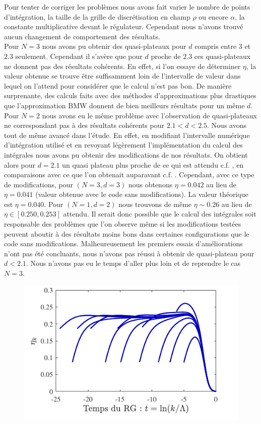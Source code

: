 \documentclass[10.5pt]{article}
\begin{document}
\begin{multicols*}{2}
 Pour tenter de corriger les problèmes nous avons fait varier le nombre de points d'intégration, la taille de la grille de discrétisation en champ $\rho$ ou encore $\alpha$, la constante multiplicative devant le régulateur. Cependant nous n'avons trouvé aucun changement de comportement des résultats.\\
\indent
Pour $N=3$ nous avons pu obtenir des quasi-plateaux pour $d$ compris entre $3$ et $2.3$ seulement. Cependant il s'avère que  pour $d$ proche de $2.3$ ces quasi-plateaux ne donnent pas des résultats cohérents. En effet, si l'on essaye de déterminer $\eta$, la valeur obtenue se trouve être suffisamment loin de l'intervalle de valeur dans lequel on l'attend pour considérer que le calcul n'est pas bon. De manière surprenante, des calculs faits avec des méthodes d'approximations plus drastiques que l'approximation BMW donnent de bien meilleurs résultats pour un même $d$.\\
\indent
Pour $N=2$ nous avons eu le même problème avec l'observation de quasi-plateaux ne correspondant pas à des résultats cohérents pour $2.1 < d < 2.5$. Nous avons tout de même avancé dans l'étude. En effet, en modifiant l'intervalle numérique d'intégration utilisé et en revoyant légèrement l'implémentation du calcul des intégrales nous avons pu obtenir des modifications de nos résultats. On obtient alors pour $d=2.1$ un quasi plateau plus proche de ce qui est attendu c.f. , en comparaisons avec ce que l'on obtenait auparavant c.f. . Cependant, avec ce type de modifications, pour $(N=3, d=3)$ nous obtenons $\eta= 0.042$ au lieu de $\eta = 0.041$ (valeur obtenue avec le code sans modifications). La valeur théorique est $\eta = 0.040$. Pour $(N=1, d=2)$ nous trouvons de même $\eta \sim 0.26$ au lieu de $\eta \in [0.250, 0.253]$ attendu. Il serait donc possible que le calcul des intégrales soit responsable des problèmes que l'on observe même si les modifications testées peuvent aboutir à des résultats moins bons dans certaines configurations que le code sans modifications. Malheureusement les premiers essais d'améliorations n'ont pas été concluants, nous n'avons pas réussi à obtenir de quasi-plateau pour $d<2.1$. Nous n'avons pas eu le temps d'aller plus loin et de reprendre le cas $N=3$.
\begin{figure}[H]
	\begin{center}
		\includegraphics[width=0.95\columnwidth]{etakd21.pdf}

\end{center}
\end{figure}
\end{multicols*}
\end{document}
